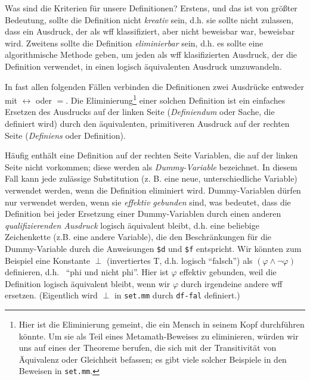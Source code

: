 Was sind die Kriterien für unsere Definitionen?  Erstens, und das ist von größter Bedeutung, sollte die Definition nicht {\em kreativ} sein, d.h. sie sollte nicht zulassen, dass ein Ausdruck, der als wff klassifiziert, aber nicht beweisbar war, beweisbar wird.   Zweitens sollte die Definition {\em eliminierbar} sein, d.h. es sollte eine algorithmische Methode geben, um jeden als wff klasifizierten Ausdruck, der die Definition verwendet, in einen logisch äquivalenten Ausdruck umzuwandeln.

In fast allen folgenden Fällen verbinden die Definitionen zwei Ausdrücke entweder mit $\leftrightarrow$ oder $=$.  Die Eliminierung\footnote{Hier ist die Eliminierung gemeint, die ein Mensch in seinem Kopf durchführen könnte.  Um sie als Teil eines Metamath-Beweises zu eliminieren, würden wir uns auf eines der Theoreme berufen, die sich mit der Transitivität von Äquivalenz oder Gleichheit befassen; es gibt viele solcher Beispiele in den Beweisen in \texttt{set.mm}.} einer solchen Definition ist ein einfaches Ersetzen des Ausdrucks auf der linken Seite ({\em Definiendum} oder Sache, die definiert wird) durch den äquivalenten, primitiveren Ausdruck auf der rechten Seite ({\em Definiens} oder Definition).

Häufig enthält eine Definition auf der rechten Seite Variablen, die auf der linken Seite nicht vorkommen; diese werden als {\em Dummy-Variable} bezeichnet.  In diesem Fall kann jede zulässige Substitution (z. B. eine neue, unterschiedliche Variable) verwendet werden, wenn die Definition eliminiert wird.  Dummy-Variablen dürfen nur verwendet werden, wenn sie {\em effektiv gebunden} sind, was bedeutet, dass die Definition bei jeder Ersetzung einer Dummy-Variablen durch einen anderen {\em qualifizierenden Ausdruck} logisch äquivalent bleibt, d.h. eine beliebige Zeichenkette (z.B. eine andere Variable), die den Beschränkungen für die Dummy-Variable durch die Anweisungen \texttt{\$d} und \texttt{\$f} entspricht.  Wir könnten zum Beispiel eine Konstante $\perp$ (invertiertes T, d.h. logisch "`falsch"') als $( \varphi \wedge \lnot \varphi )$ definieren, d.h. \ "`phi und nicht phi"'.  Hier ist $\varphi$ effektiv gebunden, weil die Definition logisch äquivalent bleibt, wenn wir $\varphi$ durch irgendeine andere wff ersetzen.  (Eigentlich wird $\perp$ in \texttt{set.mm} durch \texttt{df-fal} definiert.)

